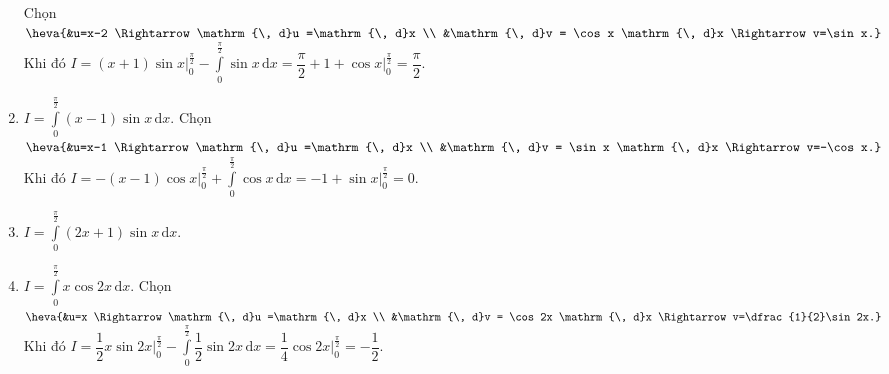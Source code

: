 \begin{bt}
\begin{enumerate}
    \loigiai
    {
    Chọn $\heva{&u=x-2 \Rightarrow \mathrm{\, d}u =\mathrm{\, d}x \\ &\mathrm{\, d}v = \cos x \mathrm{\, d}x \Rightarrow v=\sin x.}$\\
    Khi đó $I=(x+1)\sin x\Big|_0^{\tfrac{\pi}{2}} - \displaystyle\int\limits_0^{\tfrac{\pi}{2}}\sin x \mathrm{\, d}x
    =\dfrac{\pi}{2}+1+\cos x\Big|_0^{\tfrac{\pi}{2}} = \dfrac{\pi}{2}$.
    }
    \item $I=\displaystyle\int\limits_0^{\tfrac{\pi}{2}} (x-1)\sin x \mathrm{\, d}x$.
    \loigiai
    {
    Chọn $\heva{&u=x-1 \Rightarrow \mathrm{\, d}u =\mathrm{\, d}x \\ &\mathrm{\, d}v = \sin x \mathrm{\, d}x \Rightarrow v=-\cos x.}$\\
    Khi đó $I=-(x-1)\cos x\Big|_0^{\tfrac{\pi}{2}} + \displaystyle\int\limits_0^{\tfrac{\pi}{2}}\cos x \mathrm{\, d}x
    =-1+\sin x\Big|_0^{\tfrac{\pi}{2}} = 0$.
    }
    \item $I=\displaystyle\int\limits_0^{\tfrac{\pi}{2}} (2x+1)\sin x \mathrm{\, d}x$.
    \item $I=\displaystyle\int\limits_0^{\tfrac{\pi}{2}} x\cos2x \mathrm{\, d}x$.
    \loigiai
    {Chọn $\heva{&u=x \Rightarrow \mathrm{\, d}u =\mathrm{\, d}x \\ &\mathrm{\, d}v = \cos2x \mathrm{\, d}x \Rightarrow v=\dfrac{1}{2}\sin 2x.}$\\
    Khi đó $I=\dfrac{1}{2}x\sin2x\Big|_0^{\tfrac{\pi}{2}} - \displaystyle\int\limits_0^{\tfrac{\pi}{2}} \dfrac{1}{2}\sin 2x \mathrm{\, d}x
    = \dfrac{1}{4}\cos 2x \Big|_0^{\tfrac{\pi}{2}} = -\dfrac{1}{2}$.
    }
    \end{enumerate}
    \end{bt}
    
